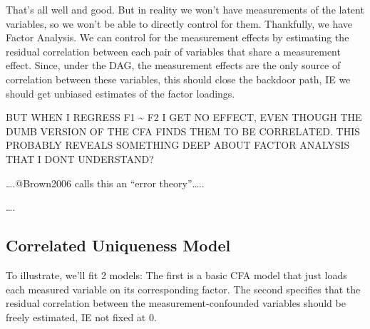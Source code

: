 \documentclass[
  letterpaper,
  DIV=11,
  numbers=noendperiod]{scrreprt}
\begin{document}
That's all well and good. But in reality we won't have measurements of
the latent variables, so we won't be able to directly control for them.
Thankfully, we have Factor Analysis. We can control for the measurement
effects by estimating the residual correlation between each pair of
variables that share a measurement effect. Since, under the DAG, the
measurement effects are the only source of correlation between these
variables, this should close the backdoor path, IE we should get
unbiased estimates of the factor loadings.

BUT WHEN I REGRESS F1 \textasciitilde{} F2 I GET NO EFFECT, EVEN THOUGH
THE DUMB VERSION OF THE CFA FINDS THEM TO BE CORRELATED. THIS PROBABLY
REVEALS SOMETHING DEEP ABOUT FACTOR ANALYSIS THAT I DONT UNDERSTAND?

\ldots.@Brown2006 calls this an ``error theory''\ldots..

\ldots.

\hypertarget{correlated-uniqueness-model}{%
\subsection*{Correlated Uniqueness
Model}\label{correlated-uniqueness-model}}

To illustrate, we'll fit 2 models: The first is a basic CFA model that
just loads each measured variable on its corresponding factor. The
second specifies that the residual correlation between the
measurement-confounded variables should be freely estimated, IE not
fixed at 0.
\end{document}
